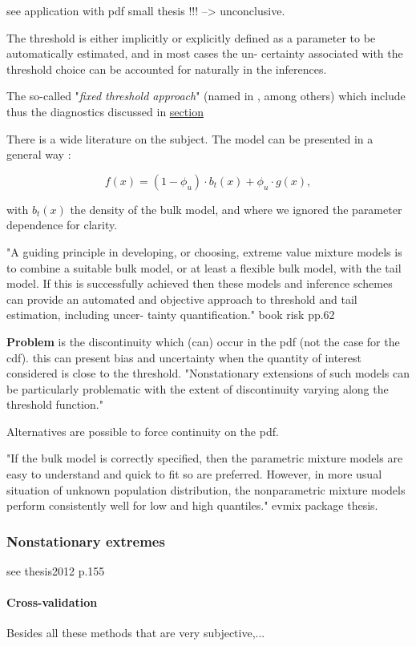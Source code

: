 \documentclass[11pt,a4paper,openany ]{book}
\begin{document}
see application with pdf small thesis !!! --> unconclusive.

The threshold is either implicitly or explicitly
defined as a parameter to be automatically estimated, and in most cases the un-
certainty associated with the threshold choice can be accounted for naturally in
the inferences.

The so-called "\emph{fixed threshold approach}" (named in 
\citet{hu_evmix:_2014}, among others) which include thus the 
diagnostics discussed in \hyperref[stdthr]{section \textbf{}}


There is a wide literature on the subject. The model can be presented in a general way : 

\begin{equation}
f(x)=(1-\phi_u)\cdot b_t(x)+\phi_u\cdot g(x),
\end{equation}

with $b_t(x)$ the density of the bulk model, and where we ignored the parameter dependence for clarity.

"A guiding principle in developing, or choosing, extreme value mixture models is to
combine a suitable bulk model, or at least a flexible bulk model, with the tail model. If
this is successfully achieved then these models and inference schemes can provide an
automated and objective approach to threshold and tail estimation, including uncer-
tainty quantification." book risk pp.62

\textbf{Problem} is the discontinuity which (can) occur in the pdf (not the case for the cdf). this can present bias and uncertainty when the quantity of interest considered is close to the threshold.
"Nonstationary extensions of such models can be particularly problematic
with the extent of discontinuity varying along the threshold function."

Alternatives are possible to force continuity on the pdf.

"If the bulk model is correctly specified, then the parametric
mixture models are easy to understand and quick to fit so are
preferred. However, in more usual situation of unknown
population distribution, the nonparametric mixture models
perform consistently well for low and high quantiles." evmix package thesis.


\subsubsection{Nonstationary extremes} see thesis2012 p.155

\paragraph*{Cross-validation}
\cite{northrop_cross_2016} 
Besides all these methods that are very subjective,...
\end{document}

